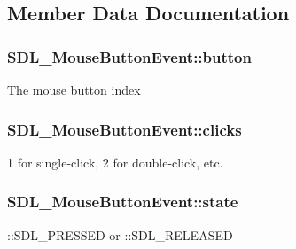 \subsection{Member Data Documentation}
\hypertarget{struct_s_d_l___mouse_button_event_a1a4680e19ae06d02d2093f0bcba1b24c}{}
\subsubsection[{button}]{ S\+D\+L\+\_\+\+Mouse\+Button\+Event\+::button}\label{struct_s_d_l___mouse_button_event_a1a4680e19ae06d02d2093f0bcba1b24c}
The mouse button index \hypertarget{struct_s_d_l___mouse_button_event_aa606bebcbc3ffc7e932016039c2a36a1}{}
\subsubsection[{clicks}]{ S\+D\+L\+\_\+\+Mouse\+Button\+Event\+::clicks}\label{struct_s_d_l___mouse_button_event_aa606bebcbc3ffc7e932016039c2a36a1}
1 for single-\/click, 2 for double-\/click, etc. \hypertarget{struct_s_d_l___mouse_button_event_a8809cef85cfffad4f2059f2ba4fc6a3d}{}
\subsubsection[{state}]{ S\+D\+L\+\_\+\+Mouse\+Button\+Event\+::state}\label{struct_s_d_l___mouse_button_event_a8809cef85cfffad4f2059f2ba4fc6a3d}
\+::\+S\+D\+L\+\_\+\+P\+R\+E\+S\+S\+E\+D or \+::\+S\+D\+L\+\_\+\+R\+E\+L\+E\+A\+S\+E\+D \hypertarget{struct_s_d_l___mouse_button_event_af64cb09ea68b8081ecc8ee498552e3d7}{}
